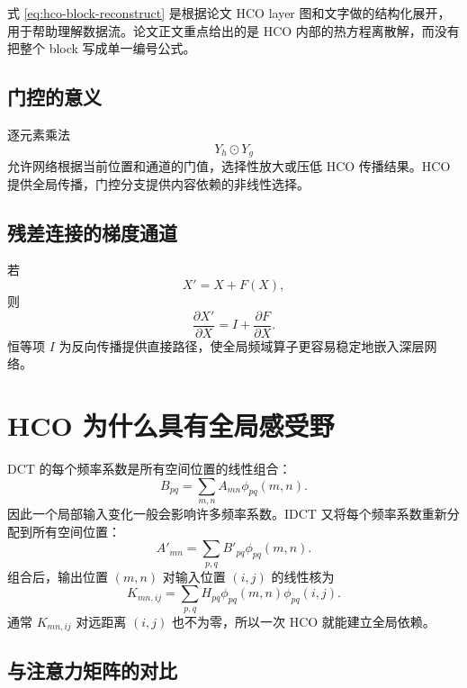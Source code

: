\documentclass[UTF8,12pt,a4paper,fontset=none]{ctexart}
\numberwithin{equation}{section}
\newcommand{\pd}{\partial}
\begin{document}
\begin{notebox}[结构公式的性质]
式 \eqref{eq:hco-block-reconstruct} 是根据论文 HCO layer 图和文字做的结构化展开，用于帮助理解数据流。论文正文重点给出的是 HCO 内部的热方程离散解，而没有把整个 block 写成单一编号公式。
\end{notebox}

\subsection{门控的意义}

逐元素乘法
\begin{equation}
  Y_h\odot Y_g
\end{equation}
允许网络根据当前位置和通道的门值，选择性放大或压低 HCO 传播结果。HCO 提供全局传播，门控分支提供内容依赖的非线性选择。

\subsection{残差连接的梯度通道}

若
\begin{equation}
  X'=X+F(X),
\end{equation}
则
\begin{equation}
  \frac{\pd X'}{\pd X}
  =I+\frac{\pd F}{\pd X}.
\end{equation}
恒等项 $I$ 为反向传播提供直接路径，使全局频域算子更容易稳定地嵌入深层网络。

\section{HCO 为什么具有全局感受野}

DCT 的每个频率系数是所有空间位置的线性组合：
\begin{equation}
  B_{pq}
  =\sum_{m,n}A_{mn}\phi_{pq}(m,n).
\end{equation}
因此一个局部输入变化一般会影响许多频率系数。IDCT 又将每个频率系数重新分配到所有空间位置：
\begin{equation}
  A'_{mn}
  =\sum_{p,q}B'_{pq}\phi_{pq}(m,n).
\end{equation}
组合后，输出位置 $(m,n)$ 对输入位置 $(i,j)$ 的线性核为
\begin{equation}
  K_{mn,ij}
  =\sum_{p,q}H_{pq}
  \phi_{pq}(m,n)\phi_{pq}(i,j).
  \label{eq:global-kernel}
\end{equation}
通常 $K_{mn,ij}$ 对远距离 $(i,j)$ 也不为零，所以一次 HCO 就能建立全局依赖。

\subsection{与注意力矩阵的对比}
\end{document}
